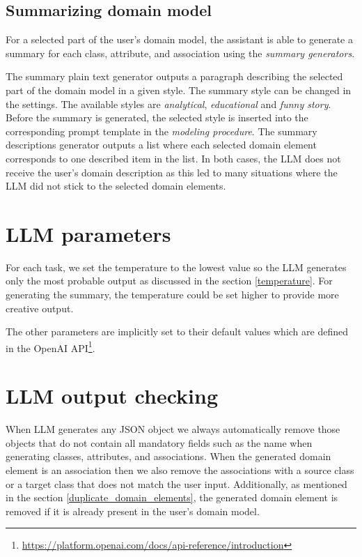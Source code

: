 \subsection{Summarizing domain model}
\label{summarising_domain_model}

For a selected part of the user's domain model, the assistant is able to generate a summary for each class, attribute, and association using the \emph{summary generators}.

The summary plain text generator outputs a paragraph describing the selected part of the domain model in a given style. The summary style can be changed in the settings. The available styles are \textit{analytical}, \textit{educational} and \textit{funny story}. Before the summary is generated, the selected style is inserted into the corresponding prompt template in the \emph{modeling procedure}. The summary descriptions generator outputs a list where each selected domain element corresponds to one described item in the list. In both cases, the LLM does not receive the user's domain description as this led to many situations where the LLM did not stick to the selected domain elements.


\section{LLM parameters}

For each task, we set the temperature to the lowest value so the LLM generates only the most probable output as discussed in the section \ref{temperature}. For generating the summary, the temperature could be set higher to provide more creative output.

The other parameters are implicitly set to their default values which are defined in the OpenAI API\footnote{\url{https://platform.openai.com/docs/api-reference/introduction}}.


\section{LLM output checking}

When LLM generates any JSON object we always automatically remove those objects that do not contain all mandatory fields such as the name when generating classes, attributes, and associations. When the generated domain element is an association then we also remove the associations with a source class or a target class that does not match the user input. Additionally, as mentioned in the section \ref{duplicate_domain_elements}, the generated domain element is removed if it is already present in the user's domain model.


